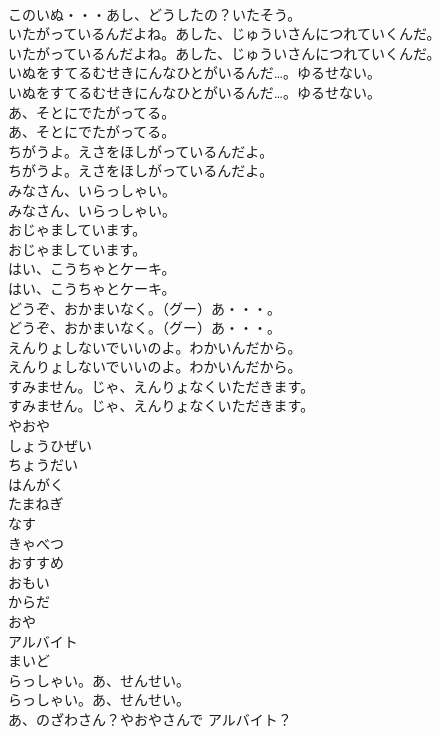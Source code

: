 \documentclass[8pt]{extreport}
\begin{document}
\begin{CJK}{UTF8}{min}
\\	このいぬ・・・あし、どうしたの？いたそう。 
\\	いたがっているんだよね。あした、じゅういさんにつれていくんだ。	
\\	いたがっているんだよね。あした、じゅういさんにつれていくんだ。 
\\	いぬをすてるむせきにんなひとがいるんだ…。ゆるせない。	
\\	いぬをすてるむせきにんなひとがいるんだ…。ゆるせない。 
\\	あ、そとにでたがってる。	
\\	あ、そとにでたがってる。 
\\	ちがうよ。えさをほしがっているんだよ。	
\\	ちがうよ。えさをほしがっているんだよ。 
\\	みなさん、いらっしゃい。	
\\	みなさん、いらっしゃい。 
\\	おじゃましています。	
\\	おじゃましています。 
\\	はい、こうちゃとケーキ。	
\\	はい、こうちゃとケーキ。 
\\	どうぞ、おかまいなく。（グー）あ・・・。	
\\	どうぞ、おかまいなく。（グー）あ・・・。 
\\	えんりょしないでいいのよ。わかいんだから。	
\\	えんりょしないでいいのよ。わかいんだから。 
\\	すみません。じゃ、えんりょなくいただきます。	
\\	すみません。じゃ、えんりょなくいただきます。 
\\	やおや
\\	しょうひぜい
\\	ちょうだい
\\	はんがく
\\	たまねぎ
\\	なす
\\	きゃべつ
\\	おすすめ
\\	おもい
\\	からだ
\\	おや
\\	アルバイト
\\	まいど
\\	らっしゃい。あ、せんせい。	
\\	らっしゃい。あ、せんせい。 
\\	あ、のざわさん？やおやさんで アルバイト？	

\end{CJK}
\end{document}

